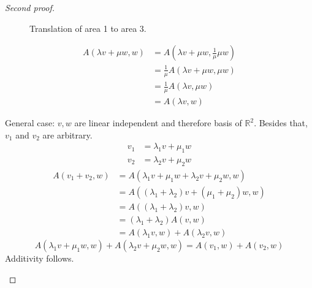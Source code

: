 \documentclass[a4paper,landscape,twocolumn]{article}
\theoremstyle{definition}
\begin{document}
\begin{proof}[Second proof]
\begin{enumerate}
\begin{figure}[!h]
\begin{center}
          \caption{Translation of area 1 to area 3.}
          \label{img:pt}
        \end{center}
      \end{figure}
      \begin{align*}
        A(\lambda v + \mu w, w)
          &= A(\lambda v + \mu w, \frac{1}{\mu} \mu w) \\
          &= \frac1\mu A(\lambda v + \mu w, \mu w) \\
          &= \frac{1}{\mu} A(\lambda v, \mu w) \\
          &= A(\lambda v, w)
      \end{align*}

      General case: $v, w$ are linear independent and therefore basis of $\mathbb R^2$.
      Besides that, $v_1$ and $v_2$ are arbitrary.
      \begin{align*}
        v_1 &= \lambda_1 v + \mu_1 w \\
        v_2 &= \lambda_2 v + \mu_2 w
      \end{align*}
      \begin{align*}
        A(v_1 + v_2, w)
          &= A(\lambda_1 v + \mu_1 w + \lambda_2 v + \mu_2 w, w) \\
          &= A((\lambda_1 + \lambda_2) v + (\mu_1 + \mu_2) w, w) \\
          &= A((\lambda_1 + \lambda_2) v, w) \\
          &= (\lambda_1 + \lambda_2) A(v, w) \\
          &= A(\lambda_1 v, w) + A(\lambda_2 v, w)
      \end{align*}
      \[ A(\lambda_1 v + \mu_1 w, w) + A(\lambda_2 v + \mu_2 w, w) = A(v_1, w) + A(v_2, w) \]
      Additivity follows.
  \end{enumerate}
\end{proof}
\end{document}
